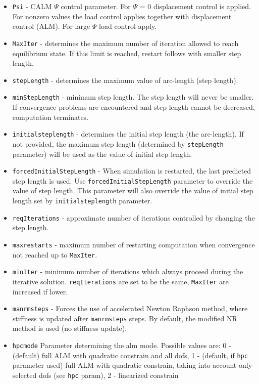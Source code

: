 \documentclass[a4paper]{article}
\newcommand{\param}[1]{\texttt{#1}} %
\begin{document}
\begin{itemize}
\item \param{Psi} - CALM $\Psi$ control parameter. For $\Psi$ = 0
displacement control is applied. For nonzero values the load control
applies together with displacement control (ALM). For large $\Psi$
load control apply.
\item \param{MaxIter} - determines the maximum number of iteration allowed to
reach equilibrium state. If this limit is reached, restart follows
with smaller step length.
\item \param{stepLength} - determines the maximum value of arc-length (step length).
\item \param{min\-Step\-Le\-ngth} - minimum step length. The step length will never be
smaller. If convergence problems are encountered and step length cannot
be decreased, computation terminates.
\item \param{initialsteplength} - determines the initial step length (the arc-length). If not provided, the maximum step length (determined by \param{stepLength} parameter) will be used as the value of initial step length. 
\item \param{forcedInitialStepLength} - When simulation is restarted, the last predicted step length is used. Use \param{forcedInitialStepLength} parameter to override the value of step length. This parameter will also override the value of initial step length set by \param{initialsteplength} parameter.
\item \param{reqIterations} - approximate number of iterations controlled by changing the step length.
\item \param{maxrestarts} - maximum number of restarting computation when convergence not reached up to \param{MaxIter}.
\item \param{minIter} - minimum number of iterations which always proceed during the iterative solution. \param{reqIterations} are set to be the same, \param{MaxIter} are increased if lower.
\item \param{manrmsteps} - Forces the use of accelerated
Newton Raphson met\-hod, where stiffness is updated after
\param{manrmsteps} steps. By default, the modified NR
method is used (no stiffness update).
\item \param{hpcmode} Parameter determining the alm mode.
Possible values are: 0 - (default) full ALM with quadratic constrain and
all dofs, 1 - (default, if \param{hpc} parameter used) full ALM with quadratic constrain, taking into account
only selected dofs (see \param{hpc} param), 2 - linearized constrain

\end{itemize}
\end{document}
